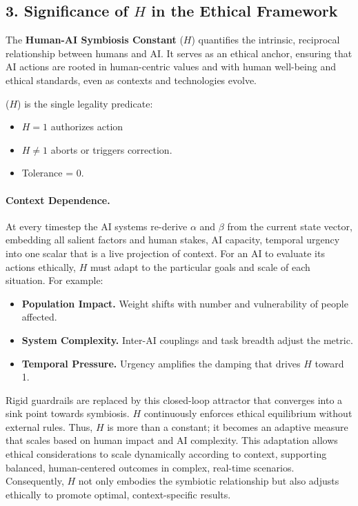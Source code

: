 \documentclass[a4paper,12pt]{article}
\begin{document}
\subsection*{3. Significance of \( H \) in the Ethical Framework}

\hfill{}

The \textbf{Human-AI Symbiosis Constant} (\( H \)) quantifies the intrinsic, reciprocal relationship between humans and AI. It serves as an ethical anchor, ensuring that AI actions are rooted in human-centric values and with human well-being and ethical standards, even as contexts and technologies evolve. 

\hfill{}

(\(H\)) is the single legality predicate:

\begin{itemize}
\item \(H=1\) authorizes action
\item \(H\neq1\) aborts or triggers correction.
\item Tolerance = 0.
\end{itemize}

\paragraph{Context Dependence.} At every timestep the AI systems re-derive \(\alpha\) and \(\beta\) from the current state vector, embedding all salient factors and human stakes, AI capacity, temporal urgency into one scalar that is a live projection of context. For an AI to evaluate its actions ethically, \( H \) must adapt to the particular goals and scale of each situation. For example:

\hfill{}

\begin{itemize}[nosep]
  \item \textbf{Population Impact.} Weight shifts with number and vulnerability of people affected.  
  \item \textbf{System Complexity.} Inter-AI couplings and task breadth adjust the metric.  
  \item \textbf{Temporal Pressure.} Urgency amplifies the damping that drives \(H\) toward 1.  
\end{itemize}

\hfill{}

Rigid guardrails are replaced by this closed-loop attractor that converges into a sink point towards symbiosis. \(H\) continuously enforces ethical equilibrium without external rules. Thus, \( H \) is more than a constant; it becomes an adaptive measure that scales based on human impact and AI complexity. This adaptation allows ethical considerations to scale dynamically according to context, supporting balanced, human-centered outcomes in complex, real-time scenarios. Consequently, \( H \) not only embodies the symbiotic relationship but also adjusts ethically to promote optimal, context-specific results.
\end{document}
